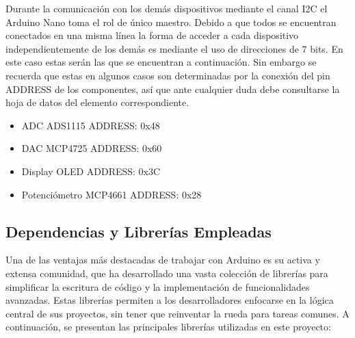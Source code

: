 Durante la comunicación con los demás dispositivos mediante el canal I2C el Arduino Nano toma el rol de único maestro. Debido a que todos se encuentran conectados en una misma línea la forma de acceder a cada dispositivo independientemente de los demás es mediante el uso de direcciones de 7 bits. En este caso estas serán las que se encuentran a continuación. Sin embargo se recuerda que estas en algunos casos son determinadas por la conexión del pin ADDRESS de los componentes, así que ante cualquier duda debe consultarse la hoja de datos del elemento correspondiente.
\begin{itemize}
    \item ADC ADS1115 ADDRESS: 0x48
    \item DAC MCP4725 ADDRESS: 0x60
    \item Display OLED ADDRESS: 0x3C
    \item Potenciómetro MCP4661 ADDRESS: 0x28
\end{itemize}

\subsection{Dependencias y Librerías Empleadas}

Una de las ventajas más destacadas de trabajar con Arduino es su activa y extensa comunidad, que ha desarrollado una vasta colección de librerías para simplificar la escritura de código y la implementación de funcionalidades avanzadas. Estas librerías permiten a los desarrolladores enfocarse en la lógica central de sus proyectos, sin tener que reinventar la rueda para tareas comunes. A continuación, se presentan las principales librerías utilizadas en este proyecto:

